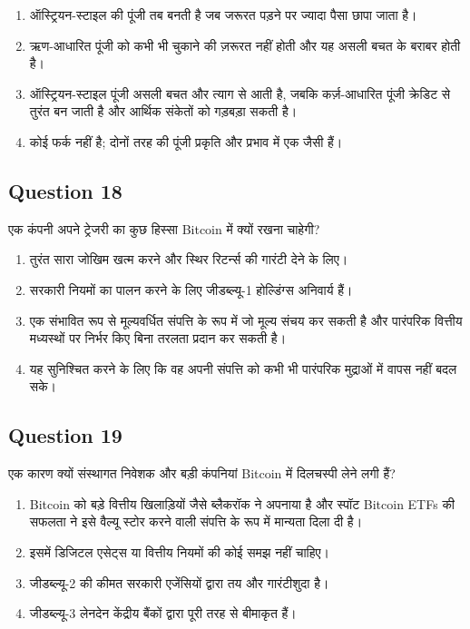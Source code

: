 \documentclass[12pt,a4paper]{article}
\begin{document}
\begin{enumerate}[label=\Alph*., leftmargin=*]
\item ऑस्ट्रियन-स्टाइल की पूंजी तब बनती है जब जरूरत पड़ने पर ज्यादा पैसा छापा जाता है।
\item ऋण-आधारित पूंजी को कभी भी चुकाने की ज़रूरत नहीं होती और यह असली बचत के बराबर होती है।
\item ऑस्ट्रियन-स्टाइल पूंजी असली बचत और त्याग से आती है, जबकि कर्ज़-आधारित पूंजी क्रेडिट से तुरंत बन जाती है और आर्थिक संकेतों को गड़बड़ा सकती है।
\item कोई फर्क नहीं है; दोनों तरह की पूंजी प्रकृति और प्रभाव में एक जैसी हैं।
\end{enumerate}

\bigskip


\subsection*{Question 18}
एक कंपनी अपने ट्रेजरी का कुछ हिस्सा Bitcoin में क्यों रखना चाहेगी?

\begin{enumerate}[label=\Alph*., leftmargin=*]
\item तुरंत सारा जोखिम खत्म करने और स्थिर रिटर्न्स की गारंटी देने के लिए।
\item सरकारी नियमों का पालन करने के लिए जीडब्ल्यू-1 होल्डिंग्स अनिवार्य हैं।
\item एक संभावित रूप से मूल्यवर्धित संपत्ति के रूप में जो मूल्य संचय कर सकती है और पारंपरिक वित्तीय मध्यस्थों पर निर्भर किए बिना तरलता प्रदान कर सकती है।
\item यह सुनिश्चित करने के लिए कि वह अपनी संपत्ति को कभी भी पारंपरिक मुद्राओं में वापस नहीं बदल सके।
\end{enumerate}

\bigskip


\subsection*{Question 19}
एक कारण क्यों संस्थागत निवेशक और बड़ी कंपनियां Bitcoin में दिलचस्पी लेने लगी हैं?

\begin{enumerate}[label=\Alph*., leftmargin=*]
\item Bitcoin को बड़े वित्तीय खिलाड़ियों जैसे ब्लैकरॉक ने अपनाया है और स्पॉट Bitcoin ETFs की सफलता ने इसे वैल्यू स्टोर करने वाली संपत्ति के रूप में मान्यता दिला दी है।
\item इसमें डिजिटल एसेट्स या वित्तीय नियमों की कोई समझ नहीं चाहिए।
\item जीडब्ल्यू-2 की कीमत सरकारी एजेंसियों द्वारा तय और गारंटीशुदा है।
\item जीडब्ल्यू-3 लेनदेन केंद्रीय बैंकों द्वारा पूरी तरह से बीमाकृत हैं।
\end{enumerate}
\end{document}
